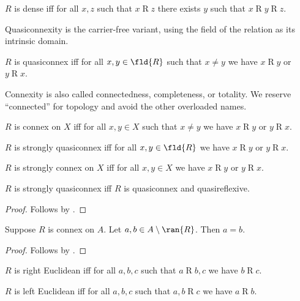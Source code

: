 \begin{definition}\label{dense}
    $R$ is dense iff
    for all $x, z$ such that $x\mathrel{R}z$
        there exists $y$ such that $x\mathrel{R}y\mathrel{R}z$.
\end{definition}

Quasiconnexity is the carrier-free variant, using the field of the relation as
its intrinsic domain.

\begin{definition}\label{quasiconnex}
    $R$ is quasiconnex iff
    for all $x, y\in\fld{R}$ such that $x\neq y$ we have
        $x\mathrel{R}y$ or $y\mathrel{R}x$.
\end{definition}

Connexity is also called connectedness, completeness, or totality. We reserve
``connected'' for topology and avoid the other overloaded names.

\begin{definition}\label{connex}
    $R$ is connex on $X$ iff
    for all $x, y\in X$ such that $x\neq y$ we have
        $x\mathrel{R}y$ or $y\mathrel{R}x$.
\end{definition}

\begin{definition}\label{strongly_quasiconnex}
    $R$ is strongly quasiconnex iff
    for all $x, y\in\fld{R}$ we have
        $x\mathrel{R}y$ or $y\mathrel{R}x$.
\end{definition}

\begin{definition}\label{strongly_connex}
    $R$ is strongly connex on $X$ iff
    for all $x, y\in X$ we have
        $x\mathrel{R}y$ or $y\mathrel{R}x$.
\end{definition}

\begin{proposition}\label{strongly_quasiconnex_iff_quasiconnex_and_quasireflexive}
    $R$ is strongly quasiconnex iff
    $R$ is quasiconnex and quasireflexive.
\end{proposition}
\begin{proof}
    Follows by .
\end{proof}

\begin{proposition}\label{connex_reaches_all_or_all_but_one}
    Suppose $R$ is connex on $A$.
    Let $a, b\in A\setminus\ran{R}$.
    Then $a = b$.
\end{proposition}
\begin{proof}
    Follows by .
\end{proof}


\begin{definition}\label{righteuclidean}
    $R$ is right Euclidean iff
    for all $a,b,c$ such that $a\mathrel{R}b,c$ we have $b\mathrel{R}c$.
\end{definition}

\begin{definition}\label{lefteuclidean}
    $R$ is left Euclidean iff
    for all $a,b,c$ such that $a,b\mathrel{R}c$ we have $a\mathrel{R}b$.
\end{definition}
